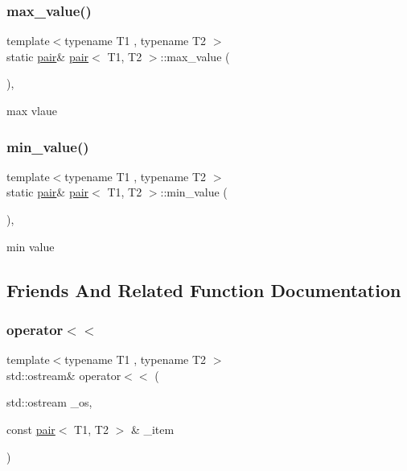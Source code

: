 \subsubsection{\texorpdfstring{max\+\_\+value()}{max\_value()}}
{\footnotesize\ttfamily template$<$typename T1 , typename T2 $>$ \\
static \hyperlink{structpair}{pair}\& \hyperlink{structpair}{pair}$<$ T1, T2 $>$\+::max\+\_\+value (\begin{DoxyParamCaption}{ }\end{DoxyParamCaption})\hspace{0.3cm}{\ttfamily [inline]}, {\ttfamily [static]}}



max vlaue 

\mbox{\label{structpair_abca1ec29c5040ce16bd3993e80d42923}} 
\subsubsection{\texorpdfstring{min\+\_\+value()}{min\_value()}}
{\footnotesize\ttfamily template$<$typename T1 , typename T2 $>$ \\
static \hyperlink{structpair}{pair}\& \hyperlink{structpair}{pair}$<$ T1, T2 $>$\+::min\+\_\+value (\begin{DoxyParamCaption}{ }\end{DoxyParamCaption})\hspace{0.3cm}{\ttfamily [inline]}, {\ttfamily [static]}}



min value 



\subsection{Friends And Related Function Documentation}
\mbox{\label{structpair_a9cd7ed0b2b2d0a6d5977137d9cf35a0c}} 
\subsubsection{\texorpdfstring{operator$<$$<$}{operator<<}}
{\footnotesize\ttfamily template$<$typename T1 , typename T2 $>$ \\
std\+::ostream\& operator$<$$<$ (\begin{DoxyParamCaption}\item[{std\+::ostream}]{\+\_\+os,  }\item[{const \hyperlink{structpair}{pair}$<$ T1, T2 $>$ \&}]{\+\_\+item }\end{DoxyParamCaption})\hspace{0.3cm}{\ttfamily [friend]}}




